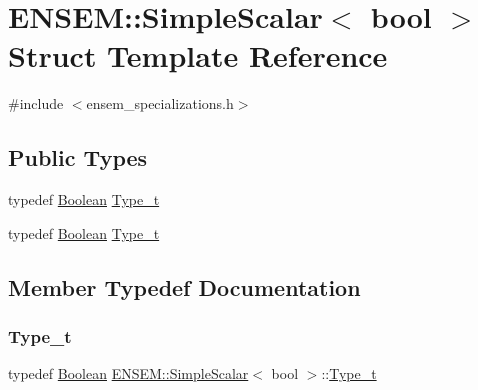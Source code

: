 \hypertarget{structENSEM_1_1SimpleScalar_3_01bool_01_4}{}\section{E\+N\+S\+EM\+:\+:Simple\+Scalar$<$ bool $>$ Struct Template Reference}
\label{structENSEM_1_1SimpleScalar_3_01bool_01_4}


{\ttfamily \#include $<$ensem\+\_\+specializations.\+h$>$}

\subsection*{Public Types}
\begin{DoxyCompactItemize}
\item 
typedef \mbox{\hyperlink{group__defs_ga38f0cd64d26e121e75367986f2d7cd6c}{Boolean}} \mbox{\hyperlink{structENSEM_1_1SimpleScalar_3_01bool_01_4_a1857cdcebad8e9a51ea6bf7234faf05d}{Type\+\_\+t}}
\item 
typedef \mbox{\hyperlink{group__defs_ga38f0cd64d26e121e75367986f2d7cd6c}{Boolean}} \mbox{\hyperlink{structENSEM_1_1SimpleScalar_3_01bool_01_4_a1857cdcebad8e9a51ea6bf7234faf05d}{Type\+\_\+t}}
\end{DoxyCompactItemize}


\subsection{Member Typedef Documentation}
\mbox{\label{structENSEM_1_1SimpleScalar_3_01bool_01_4_a1857cdcebad8e9a51ea6bf7234faf05d}} 
\subsubsection{\texorpdfstring{Type\_t}{Type\_t}\hspace{0.1cm}{\footnotesize\ttfamily [1/2]}}
{\footnotesize\ttfamily typedef \mbox{\hyperlink{group__defs_ga38f0cd64d26e121e75367986f2d7cd6c}{Boolean}} \mbox{\hyperlink{structENSEM_1_1SimpleScalar}{E\+N\+S\+E\+M\+::\+Simple\+Scalar}}$<$ bool $>$\+::\mbox{\hyperlink{structENSEM_1_1SimpleScalar_3_01bool_01_4_a1857cdcebad8e9a51ea6bf7234faf05d}{Type\+\_\+t}}}

